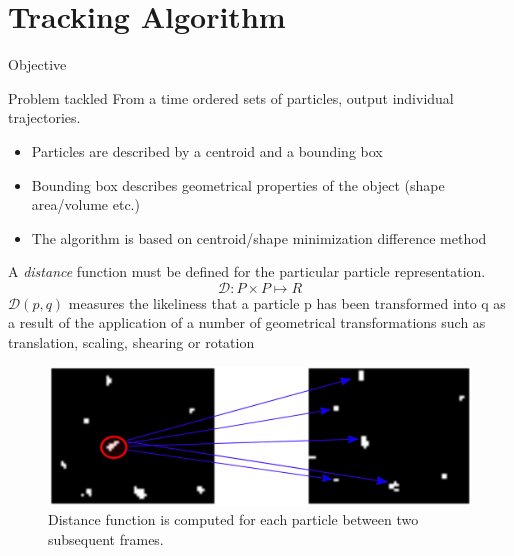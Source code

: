 \documentclass{beamer}
\begin{document}
	
		
	\section{Tracking Algorithm}
		\begin{frame}{Objective}
			\begin{block}{Problem tackled}
				From a time ordered sets of particles, output individual trajectories. 
\begin{itemize}
	\item Particles are described by a centroid and a bounding
box
\item Bounding box describes geometrical properties of the object
(shape area/volume etc.)
\item The algorithm is based on centroid/shape minimization
difference method
\end{itemize}
			\end{block}
	        \end{frame}
        
        


        \begin{frame}

			A \textit{distance} function must be defined for the particular particle representation. 
			\[
			\mathcal{D} : P \times P \mapsto R
			\]
$\mathcal{D}(p, q)$ measures the likeliness that
a particle p has been transformed into q as a result of the
application of a number of geometrical transformations such
as translation, scaling, shearing or rotation	


		\begin{figure}
					\centering
					\includegraphics[scale=0.20]{./images/freccia.png}
					\caption{Distance function is computed for each particle between two subsequent frames.}
				\end{figure}
			\end{frame}
	
\end{document}
